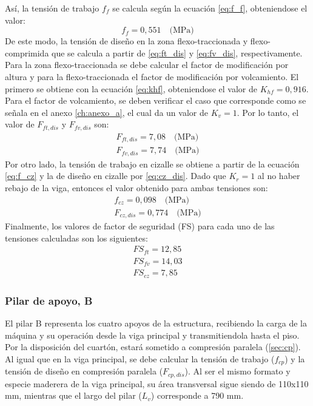Así, la tensión de trabajo $f_f$ se calcula según la ecuación \ref{eq:f_f}, obteniendose el valor:
\begin{equation}
	f_f = 0,551 \quad \text{(MPa)}
\end{equation}
De este modo, la tensión de diseño en la zona flexo-traccionada y flexo-comprimida que se calcula a partir de \ref{eq:ft_dis} y \ref{eq:fv_dis}, respectivamente. Para la zona flexo-traccionada se debe calcular el factor de modificación por altura y para la flexo-traccionada el factor de modificación por volcamiento. El primero se obtiene con la ecuación \ref{eq:khf}, obteniendose el valor de $K_{hf} = 0,916$. Para el factor de volcamiento, se deben verificar el caso que corresponde como se señala en el anexo \ref{ch:anexo_a}, el cual da un valor de $K_v=1$. Por lo tanto, el valor de $F_{ft,dis}$ y $F_{fv,dis}$ son:
\begin{subequations}
\begin{gather}
	F_{ft,dis} = 7,08 \quad \text{(MPa)}\\
	F_{fv,dis} = 7,74 \quad \text{(MPa)} 
\end{gather}
\end{subequations}
Por otro lado, la tensión de trabajo en cizalle se obtiene a partir de la ecuación \ref{eq:f_cz} y la de diseño en cizalle por \ref{eq:cz_dis}. Dado que $K_r=1$ al no haber rebajo de la viga, entonces el valor obtenido para ambas tensiones son:
\begin{gather}
	f_{cz} = 0,098 \quad \text{(MPa)}\\
	F_{cz,dis} = 0,774 \quad \text{(MPa)}
\end{gather}
Finalmente, los valores de factor de seguridad (FS) para cada uno de las tensiones calculadas son los siguientes:
\begin{subequations}
\begin{gather}
	FS_{ft} = 12,85\\
	FS_{fv} = 14,03\\
	FS_{cz} = 7,85
\end{gather}
\end{subequations}

\subsubsection{Pilar de apoyo, B}
El pilar B representa los cuatro apoyos de la estructura, recibiendo la carga de la máquina y su operación desde la viga principal y transmitiendola hasta el piso. Por la disposición del cuartón, estará sometido a compresión paralela (\ref{sec:cp}). Al igual que en la viga principal, se debe calcular la tensión de trabajo ($f_{cp}$) y la tensión de diseño en compresión paralela ($F_{cp,dis}$). Al ser el mismo formato y especie maderera de la viga principal, su área transversal sigue siendo de 110x110 mm, mientras que el largo del pilar ($L_v$) corresponde a 790 mm.

